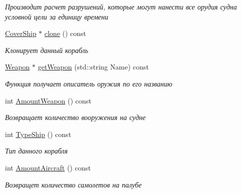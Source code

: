 \begin{DoxyCompactItemize}
\begin{DoxyCompactList}\small\item\em Производит расчет разрушений, которые могут нанести все орудия судна условной цели за единицу времени \end{DoxyCompactList}\item 
\mbox{\hyperlink{class_aircraft_carrier_group_1_1_cover_ship}{Cover\+Ship}} $\ast$ \mbox{\hyperlink{class_aircraft_carrier_group_1_1_cover_ship_aa6a5b007f5e05f9ad5cc300b8958309a}{clone}} () const
\begin{DoxyCompactList}\small\item\em Клонирует данный корабль \end{DoxyCompactList}\item 
\mbox{\hyperlink{class_aircraft_carrier_group_1_1_weapon}{Weapon}} $\ast$ \mbox{\hyperlink{class_aircraft_carrier_group_1_1_cover_ship_ab587c598ab12561d4ecad32c5f55a04e}{get\+Weapon}} (std\+::string Name) const
\begin{DoxyCompactList}\small\item\em Функция получает описатель оружия по его названию \end{DoxyCompactList}\item 
\mbox{\label{class_aircraft_carrier_group_1_1_cover_ship_a256c7ec80309594f70f3c2e91b9b59d7}} 
int \mbox{\hyperlink{class_aircraft_carrier_group_1_1_cover_ship_a256c7ec80309594f70f3c2e91b9b59d7}{Amount\+Weapon}} () const
\begin{DoxyCompactList}\small\item\em Возвращает количество вооружения на судне \end{DoxyCompactList}\item 
\mbox{\label{class_aircraft_carrier_group_1_1_cover_ship_a0cc75b445352e2c2c816d9a31884372b}} 
int \mbox{\hyperlink{class_aircraft_carrier_group_1_1_cover_ship_a0cc75b445352e2c2c816d9a31884372b}{Type\+Ship}} () const
\begin{DoxyCompactList}\small\item\em Тип данного корабля \end{DoxyCompactList}\item 
int \mbox{\hyperlink{class_aircraft_carrier_group_1_1_cover_ship_ac53b388322ccc63153ffc6edd2811d7c}{Amount\+Aircraft}} () const
\begin{DoxyCompactList}\small\item\em Возвращет количество самолетов на палубе \end{DoxyCompactList}\item 

\end{DoxyCompactItemize}
